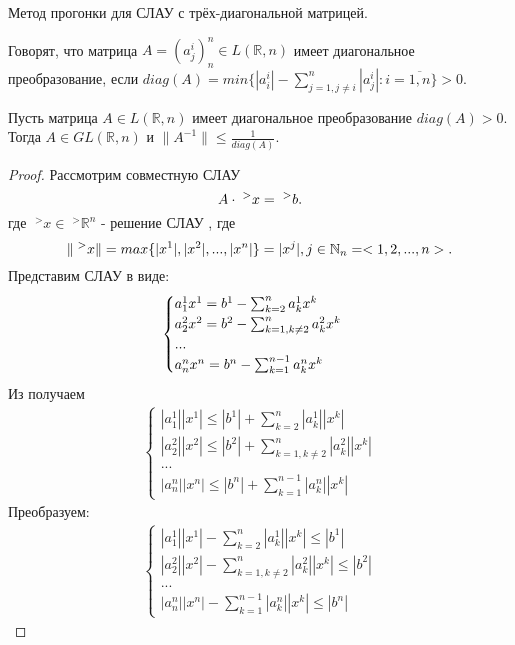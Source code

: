 \documentclass[__main__.tex]{subfiles}
\begin{document}
Метод прогонки для СЛАУ с трёх-диагональной матрицей.

\begin{definition}
	Говорят, что матрица $A = (a^i_j)^n_n \in L(\mathbb{R},n)$ имеет диагональное преобразование, если $diag(A) = min\lbrace |a^i_i| - \sum_{j=1, j \neq i}^{n} |a^i_j|: i = \overline{1,n} \rbrace > 0$.		
\end{definition}

\begin{theorem}
	Пусть матрица $A \in L(\mathbb{R},n)$ имеет диагональное преобразование $diag(A) > 0$. Тогда $A \in GL(\mathbb{R},n)$ и $\lVert A^{-1} \rVert \leqslant \frac{1}{diag(A)}$.
\end{theorem}

\begin{proof}
	Рассмотрим совместную СЛАУ
	\begin{equation}
	\llabel{2_1}
	A \cdot \;^{>}x = \;^{>}b.
	\end{equation}
	где $\;^{>}x \in \;^{>}\mathbb{R}^n$ - решение СЛАУ , где 
	\begin{equation}
	\llabel{2_2}
	\lVert \;^{>}x \rVert = max \lbrace |x^1|, |x^2|, ... , |x^n| \rbrace = |x^j|, j \in \mathbb{N}_n = <1, 2, ..., n>.
	\end{equation}
	Представим СЛАУ  в виде:
	\begin{gather}
	\llabel{2_3}
	\begin{cases}
	a^1_1 x^1 = b^1 - \sum_{k=2}^{n} a^1_k x^k \\
	a^2_2 x^2 = b^2 - \sum_{k=1, k\neq 2}^{n} a^2_k x^k \\
	...\\
	a^n_n x^n = b^n - \sum_{k=1}^{n-1} a^n_k x^k	
	\end{cases}
	\end{gather}
	Из  получаем 
	\begin{gather*}
	\begin{cases}
	|a^1_1| |x^1| \leqslant |b^1| + \sum_{k=2}^{n} |a^1_k| |x^k| \\
	|a^2_2| |x^2| \leqslant |b^2| + \sum_{k=1,k \neq 2}^{n} |a^2_k| |x^k| \\
	... \\
	|a^n_n| |x^n| \leqslant |b^n| + \sum_{k=1}^{n-1} |a^n_k| |x^k|
	\end{cases}
	\end{gather*}
	Преобразуем:
	\begin{gather*}
	\begin{cases}
	|a^1_1| |x^1| - \sum_{k=2}^{n} |a^1_k| |x^k| \leqslant |b^1| \\
	|a^2_2| |x^2| - \sum_{k=1,k \neq 2}^{n} |a^2_k| |x^k| \leqslant |b^2| \\
	... \\
	|a^n_n| |x^n| - \sum_{k=1}^{n-1} |a^n_k| |x^k| \leqslant |b^n|
	\end{cases}
	\end{gather*}
	

\end{proof}
\end{document}
